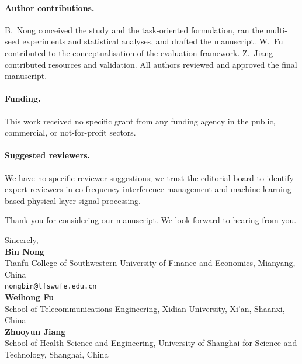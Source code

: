 \documentclass[11pt,a4paper]{article}
\begin{document}
\paragraph{Author contributions.}
B.~Nong conceived the study and the task-oriented formulation, ran the
multi-seed experiments and statistical analyses, and drafted the
manuscript. W.~Fu contributed to the conceptualisation of the
evaluation framework. Z.~Jiang contributed resources and validation.
All authors reviewed and approved the final manuscript.

\paragraph{Funding.}
This work received no specific grant from any funding agency in the
public, commercial, or not-for-profit sectors.

\paragraph{Suggested reviewers.}
We have no specific reviewer suggestions; we trust the editorial board
to identify expert reviewers in co-frequency interference management and
machine-learning-based physical-layer signal processing.

\vspace{1em}

\noindent Thank you for considering our manuscript. We look forward to
hearing from you.

\vspace{2em}

\noindent Sincerely,\\[1.4em]
\textbf{Bin Nong}\\
Tianfu College of Southwestern University of Finance and Economics, Mianyang, China\\
\texttt{nongbin@tfswufe.edu.cn}\\[0.6em]
\textbf{Weihong Fu}\\
School of Telecommunications Engineering, Xidian University, Xi'an, Shaanxi, China\\[0.6em]
\textbf{Zhuoyun Jiang}\\
School of Health Science and Engineering, University of Shanghai for
Science and Technology, Shanghai, China
\end{document}
